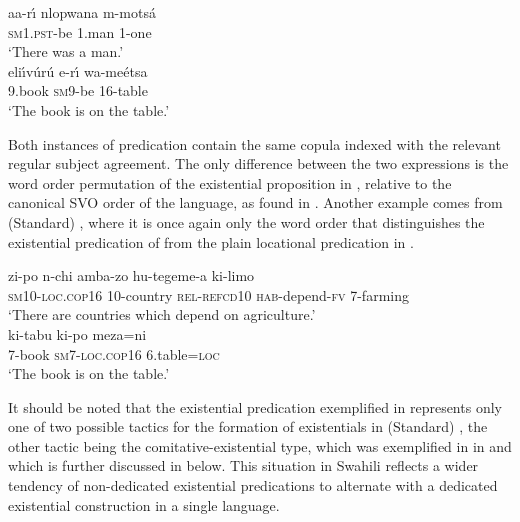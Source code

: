 \documentclass[output=paper,draft,draftmode,colorlinks,citecolor=brown]{langscibook}
\begin{document}
\ea\label{ex:makhuwa-man-table}

\ea\label{ex:makhuwa-man}
\gll aa-r{\'\i} nlopwana  m-motsá\\
     \textsc{sm}1.\textsc{pst}-be 1.man 1-one\\
\glt `There was a man.'\\
\ex\label{ex:makhuwa-table}
\gll eli{\'\i}vúrú e-r{\'\i} wa-me{é}tsa\\
	9.book \textsc{sm}9-be 16-table\\
\glt `The book is on the table.'
\z
\z

Both instances of predication contain the same copula indexed with the
relevant regular subject agreement. The only difference between the two
expressions is the word order permutation of the existential proposition in
, relative to the canonical SVO order of the language,
as found in . Another example comes from
(Standard)
, where it is once again only the word order that
distinguishes the existential predication of 
from the plain locational predication in .

\ea\label{ex:swahili-agriculture-table}

\ea\label{ex:swahili-agriculture}
\gll zi-po n-chi amba-zo hu-tegeme-a ki-limo\\
     \textsc{sm}10-\textsc{loc.cop}16 10-country \textsc{rel-refcd}10 \textsc{hab}-depend-\textsc{fv} 7-farming\\
\glt `There are countries which depend on agriculture.'\\
\ex\label{ex:swahili-table}
\gll ki-tabu ki-po meza=ni\\
	7-book \textsc{sm7-loc.cop16} 6.table=\textsc{loc}\\
\glt `The book is on the table.'
\z
\z

It should be noted that the existential predication exemplified in
 represents only one of two possible tactics
for the formation of existentials in (Standard) , the other tactic being the comitative-existential type, which was exemplified in  in  and which is further discussed in  below. This situation in Swahili reflects a wider tendency of non-dedicated existential predications to alternate with a dedicated existential construction in a single language. 
\end{document}
